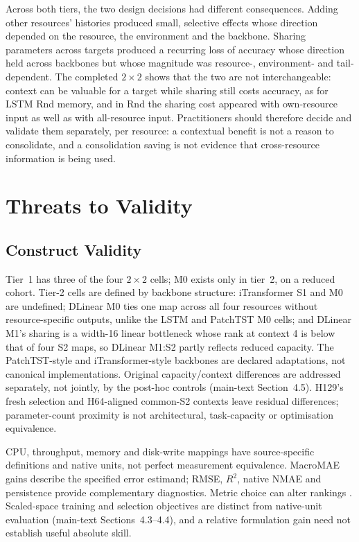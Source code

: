 \documentclass[a4paper,11pt]{article}
\begin{document}
Across both tiers, the two design decisions had different consequences.
Adding other resources' histories produced small, selective effects whose
direction depended on the resource, the environment and the backbone.
Sharing parameters across targets produced a recurring loss of accuracy
whose direction held across backbones but whose magnitude was resource-,
environment- and tail-dependent. The completed $2\times2$ shows that the two
are not interchangeable: context can be valuable for a target while sharing
still costs accuracy, as for LSTM Rnd memory, and in Rnd the sharing cost
appeared with own-resource input as well as with all-resource input. Practitioners should therefore decide
and validate them separately, per resource: a contextual benefit is not a
reason to consolidate, and a consolidation saving is not evidence that
cross-resource information is being used.

\section*{Threats to Validity}


\subsection*{Construct Validity}


Tier~1 has three of the four $2\times2$ cells; M0 exists only in tier~2,
on a reduced cohort. Tier-2 cells are defined by backbone structure:
iTransformer S1 and M0 are undefined; DLinear M0 ties one map across all
four resources without resource-specific outputs, unlike the LSTM and
PatchTST M0 cells; and DLinear M1's sharing is a width-16 linear bottleneck
whose rank at context 4 is below that of four S2 maps, so DLinear M1:S2 partly
reflects reduced capacity. The PatchTST-style and iTransformer-style
backbones are declared adaptations, not canonical implementations. Original
capacity/context differences are addressed separately, not jointly, by the
post-hoc controls (main-text Section~4.5). H129's fresh selection
and H64-aligned common-S2 contexts leave residual differences; parameter-count
proximity is not architectural, task-capacity or optimisation equivalence.

CPU, throughput, memory and disk-write mappings have source-specific
definitions and native units, not perfect measurement equivalence.
MacroMAE gains describe the specified error estimand; RMSE, $R^2$, native
NMAE and persistence provide complementary diagnostics. Metric choice can
alter rankings \citep{Hyndman2006Accuracy}. Scaled-space training and selection
objectives are distinct from native-unit evaluation
(main-text Sections~4.3--4.4), and a relative
formulation gain need not establish useful absolute skill.
\end{document}
